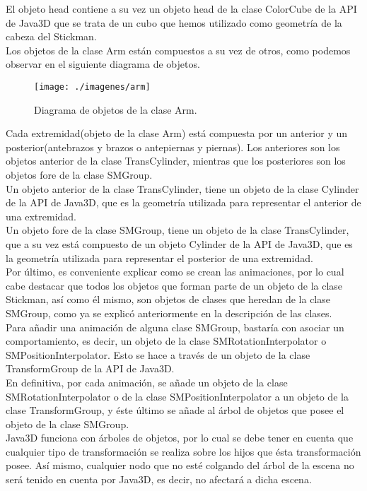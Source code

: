    El objeto head contiene a su vez un objeto head de la clase ColorCube de la API de Java3D que se trata de un cubo que hemos
   utilizado como geometría de la cabeza del Stickman.\\

   Los objetos de la clase Arm están compuestos a su vez de otros, como podemos observar en el siguiente diagrama de objetos.
   \begin{figure} [H] \begin{center}
      \texttt{[image: ./imagenes/arm]}\label{arm}
      \caption{Diagrama de objetos de la clase Arm.}
   \end{center} \end{figure}

   Cada extremidad(objeto de la clase Arm) está compuesta por un anterior y un posterior(antebrazos y brazos o antepiernas y 
   piernas). Los anteriores son los objetos anterior de la clase TransCylinder, mientras que los posteriores son los objetos fore
   de la clase SMGroup.\\

   Un objeto anterior de la clase TransCylinder, tiene un objeto de la clase Cylinder de la API de Java3D, que es la geometría
   utilizada para representar el anterior de una extremidad.\\

   Un objeto fore de la clase SMGroup, tiene un objeto de la clase TransCylinder, que a su vez está compuesto de un objeto 
   Cylinder de la API de Java3D, que es la geometría utilizada para representar el posterior de una extremidad.\\

   Por último, es conveniente explicar como se crean las animaciones, por lo cual cabe destacar que todos los objetos que forman
   parte de un objeto de la clase Stickman, así como él mismo, son objetos de clases que heredan de la clase SMGroup, como ya se
   explicó anteriormente en la descripción de las clases.\\

   Para añadir una animación de alguna clase SMGroup, bastaría con asociar un comportamiento, es decir, un objeto de la clase
   SMRotationInterpolator o SMPositionInterpolator. Esto se hace a través de un objeto de la clase TransformGroup de la API de Java3D.\\

   En definitiva, por cada animación, se añade un objeto de la clase SMRotationInterpolator o de la clase SMPositionInterpolator
   a un objeto de la clase TransformGroup, y éste último se añade al árbol de objetos que posee el objeto de la clase SMGroup.\\

   Java3D funciona con árboles de objetos, por lo cual se debe tener en cuenta que cualquier tipo de transformación se realiza sobre los
   hijos que ésta transformación posee. Así mismo, cualquier nodo que no esté colgando del árbol de la escena no será tenido
   en cuenta por Java3D, es decir, no afectará a dicha escena.\\

   

